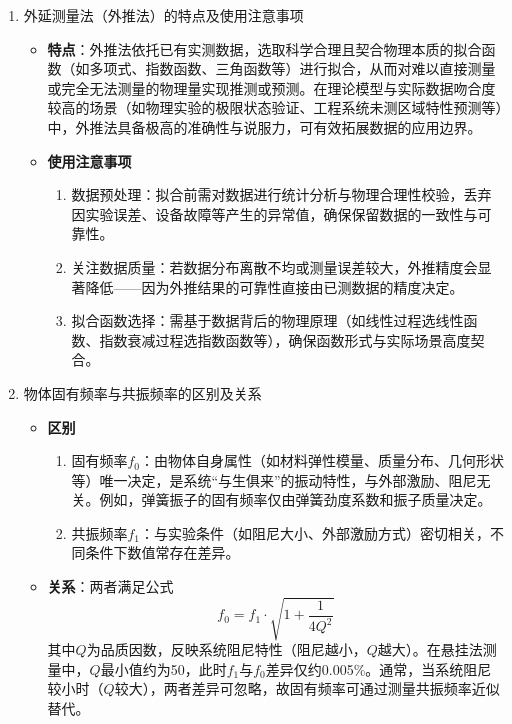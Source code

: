 \documentclass[11pt]{article}
\begin{document}
\begin{enumerate}
    \item[7.3.1] 外延测量法（外推法）的特点及使用注意事项
    \begin{itemize}
        \item \textbf{特点}：外推法依托已有实测数据，选取科学合理且契合物理本质的拟合函数（如多项式、指数函数、三角函数等）进行拟合，从而对难以直接测量或完全无法测量的物理量实现推测或预测。在理论模型与实际数据吻合度较高的场景（如物理实验的极限状态验证、工程系统未测区域特性预测等）中，外推法具备极高的准确性与说服力，可有效拓展数据的应用边界。
        \item \textbf{使用注意事项}
        \begin{enumerate}
            \item 数据预处理：拟合前需对数据进行统计分析与物理合理性校验，丢弃因实验误差、设备故障等产生的异常值，确保保留数据的一致性与可靠性。
            \item 关注数据质量：若数据分布离散不均或测量误差较大，外推精度会显著降低——因为外推结果的可靠性直接由已测数据的精度决定。
            \item 拟合函数选择：需基于数据背后的物理原理（如线性过程选线性函数、指数衰减过程选指数函数等），确保函数形式与实际场景高度契合。
        \end{enumerate}
    \end{itemize}

    \item[7.3.2] 物体固有频率与共振频率的区别及关系
    \begin{itemize}
        \item \textbf{区别}
        \begin{enumerate}
            \item 固有频率\( f_0 \)：由物体自身属性（如材料弹性模量、质量分布、几何形状等）唯一决定，是系统“与生俱来”的振动特性，与外部激励、阻尼无关。例如，弹簧振子的固有频率仅由弹簧劲度系数和振子质量决定。
            \item 共振频率\( f_1 \)：与实验条件（如阻尼大小、外部激励方式）密切相关，不同条件下数值常存在差异。
        \end{enumerate}
        \item \textbf{关系}：两者满足公式
        \[
        f_0 = f_1 \cdot \sqrt{1 + \frac{1}{4Q^2}}
        \]
        其中\( Q \)为\(\textbf{品质因数}\)，反映系统阻尼特性（阻尼越小，\( Q \)越大）。在悬挂法测量中，\( Q \)最小值约为50，此时\( f_1 \)与\( f_0 \)差异仅约0.005\%。通常，当系统阻尼较小时（\( Q \)较大），两者差异可忽略，故固有频率可通过测量共振频率近似替代。
    \end{itemize}
\end{enumerate}
\end{document}
